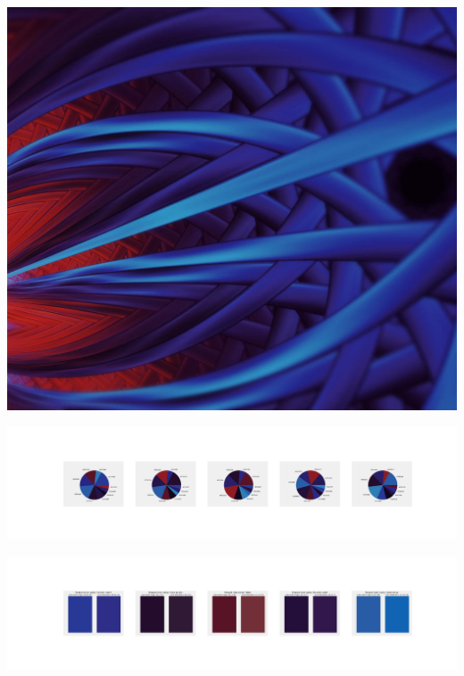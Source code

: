 \documentclass[11pt]{article}
\begin{document}
\begin{landscape}
    \begin{center}
    \includegraphics[width=\textwidth]{./nbimg/file (179).jpg}
    \end{center}

    \begin{center}
    \includegraphics[width=250mm]{./nbimg/pie-88.jpg}
    \end{center}

    \begin{center}
    \includegraphics[width=250mm]{./nbimg/peak-88.jpg}
    \end{center}
    


\end{landscape}
\end{document}
